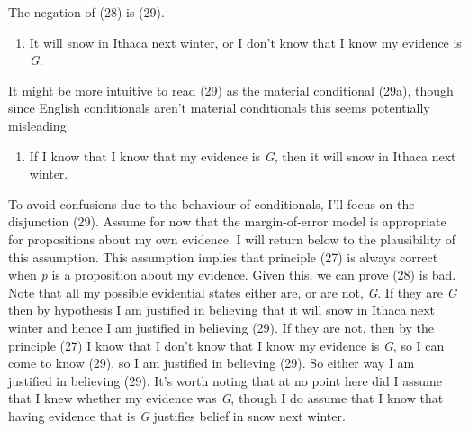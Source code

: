\documentclass[
  11pt,
  letterpaper,
  DIV=11,
  numbers=noendperiod,
  oneside]{scrartcl}
\providecommand{\tightlist}{%
  \setlength{\itemsep}{0pt}\setlength{\parskip}{0pt}}\usepackage{longtable,booktabs,array}
\begin{document}
The negation of (28) is (29).

\begin{enumerate}
\def\labelenumi{\arabic{enumi}.}
\setcounter{enumi}{28}
\tightlist
\item
  It will snow in Ithaca next winter, or I don't know that I know my
  evidence is \emph{G}.
\end{enumerate}

It might be more intuitive to read (29) as the material conditional
(29a), though since English conditionals aren't material conditionals
this seems potentially misleading.

\begin{enumerate}
\def\labelenumi{\arabic{enumi}.}
\setcounter{enumi}{28}
\tightlist
\item
  If I know that I know that my evidence is \emph{G}, then it will snow
  in Ithaca next winter.
\end{enumerate}

To avoid confusions due to the behaviour of conditionals, I'll focus on
the disjunction (29). Assume for now that the margin-of-error model is
appropriate for propositions about my own evidence. I will return below
to the plausibility of this assumption. This assumption implies that
principle (27) is always correct when \emph{p} is a proposition about my
evidence. Given this, we can prove (28) is bad. Note that all my
possible evidential states either are, or are not, \emph{G}. If they are
\emph{G} then by hypothesis I am justified in believing that it will
snow in Ithaca next winter and hence I am justified in believing (29).
If they are not, then by the principle (27) I know that I don't know
that I know my evidence is \emph{G}, so I can come to know (29), so I am
justified in believing (29). So either way I am justified in believing
(29). It's worth noting that at no point here did I assume that I knew
whether my evidence was \emph{G}, though I do assume that I know that
having evidence that is \emph{G} justifies belief in snow next winter.
\end{document}

